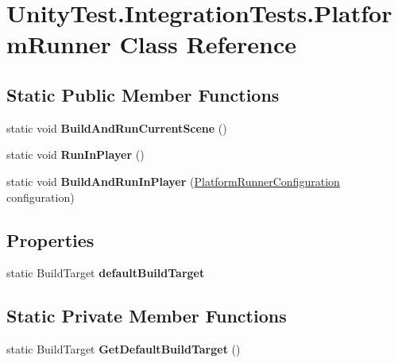 \hypertarget{class_unity_test_1_1_integration_tests_1_1_platform_runner}{}\section{Unity\+Test.\+Integration\+Tests.\+Platform\+Runner Class Reference}
\label{class_unity_test_1_1_integration_tests_1_1_platform_runner}
\subsection*{Static Public Member Functions}
\begin{DoxyCompactItemize}
\item 
\mbox{\label{class_unity_test_1_1_integration_tests_1_1_platform_runner_ab35a48983d1864312a904f73c92614a5}} 
static void {\bfseries Build\+And\+Run\+Current\+Scene} ()
\item 
\mbox{\label{class_unity_test_1_1_integration_tests_1_1_platform_runner_a4473ab20a51ecbd27c1e2b845b88b913}} 
static void {\bfseries Run\+In\+Player} ()
\item 
\mbox{\label{class_unity_test_1_1_integration_tests_1_1_platform_runner_a05bbd625b671bef3cc4988bdb65867c4}} 
static void {\bfseries Build\+And\+Run\+In\+Player} (\hyperlink{class_platform_runner_configuration}{Platform\+Runner\+Configuration} configuration)
\end{DoxyCompactItemize}
\subsection*{Properties}
\begin{DoxyCompactItemize}
\item 
\mbox{\label{class_unity_test_1_1_integration_tests_1_1_platform_runner_a4461c573762efd80baf46e55a2fb0fad}} 
static Build\+Target {\bfseries default\+Build\+Target}
\end{DoxyCompactItemize}
\subsection*{Static Private Member Functions}
\begin{DoxyCompactItemize}
\item 
\mbox{\label{class_unity_test_1_1_integration_tests_1_1_platform_runner_a68b37b12a6b6c92581173dfbbf7007a6}} 
static Build\+Target {\bfseries Get\+Default\+Build\+Target} ()
\end{DoxyCompactItemize}


